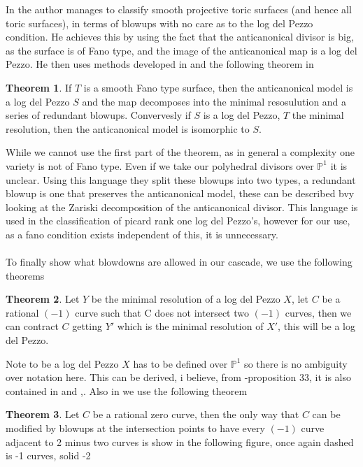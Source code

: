\documentclass[11pt]{report}
\theoremstyle{definition}
\newtheorem{thm}{Theorem}[section]
\theoremstyle{definition}
\theoremstyle{definition}
\theoremstyle{definition}
\theoremstyle{definition}
\theoremstyle{definition}
\theoremstyle{definition}
\begin{document}
In \cite{H2} the author manages to classify smooth projective toric surfaces (and hence all toric surfaces), in terms of blowups with no care as to the log del Pezzo condition. He achieves this by using the fact that the anticanonical divisor is big, as the surface is of Fano type, and the image of the anticanonical map is a log del Pezzo. He then uses methods developed in \cite{Sakai} and the following theorem in \cite{HP} 
\begin{thm} 
If $T$ is a smooth Fano type surface, then the anticanonical model is a log del Pezzo $S$ and the map decomposes into the minimal resosulution and a series of redundant blowups. Convervesly if $S$ is a log del Pezzo, $T$ the minimal resolution, then the anticanonical model is isomorphic to $S$.
\end{thm}
While we cannot use the first part of the theorem, as in general a complexity one variety is not of Fano type. Even if we take our polyhedral divisors over $\mathbb{P}^1$ it is unclear. Using this language they split these blowups into two types, a redundant blowup is one that preserves the anticanonical model, these can be described bvy looking at the Zariski decomposition of the anticanonical divisor. This language is used in the classification of picard rank one log del Pezzo's, however for our use, as a fano condition exists independent of this, it is unnecessary.
\\
\\
To finally show what blowdowns are allowed in our cascade, we use the following theorems 
\begin{thm}
Let $Y$ be the minimal resolution of a log del Pezzo $X$, let $C$ be a rational $(-1)$ curve such that C does not intersect two $(-1)$ curves, then we can contract $C$ getting $Y'$ which is the minimal resolution of $X'$, this will be a log del Pezzo.
\end{thm}
Note to be a log del Pezzo $X$ has to be defined over $\mathbb{P}^1$ so there is no ambiguity over notation here.
This can be derived, i believe, from \cite{CH}-proposition 33, it is also contained in \cite{ZDQ} and \cite{H1},\cite{H2}. Also in \cite{ZDQ} we use the following theorem 
\begin{thm} \label{T:ZDQ}
Let $C$ be a rational zero curve, then the only way that $C$ can be modified by blowups at the intersection points to have every $(-1)$ curve adjacent to 2 minus two curves is show in the following figure, once again dashed is -1 curves, solid -2
\end{thm}
\end{document}

